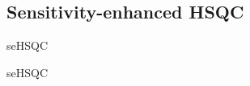 \subsection{Sensitivity-enhanced HSQC}
\label{subsec:noah__sehsqc}

\carbon{} seHSQC

\nitrogen{} seHSQC
